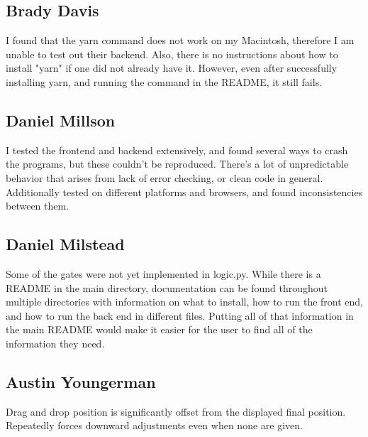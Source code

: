 \documentclass[11pt]{article}
\begin{document}
        \subsection*{Brady Davis}
            I found that the yarn command does not work on my Macintosh, therefore I am unable to test out their backend. Also, there is no instructions about how to install "yarn" if one did not already have it. However, even after successfully installing yarn, and running the command in the README, it still fails.

        \subsection*{Daniel Millson}
            I tested the frontend and backend extensively, and found several ways to crash the programs, but these couldn't be reproduced. There's a lot of unpredictable behavior that arises from lack of error checking, or clean code in general. Additionally tested on different platforms and browsers, and found inconsistencies between them. 

        \subsection*{Daniel Milstead}
            Some of the gates were not yet implemented in logic.py. While there is a README in the main directory, documentation can be found throughout multiple directories with information on what to install, how to run the front end, and how to run the back end in different files. Putting all of that information in the main README would make it easier for the user to find all of the information they need.

        \subsection*{Austin Youngerman}
            Drag and drop position is significantly offset from the displayed final position. Repeatedly forces downward adjustments even when none are given.
\end{document}
